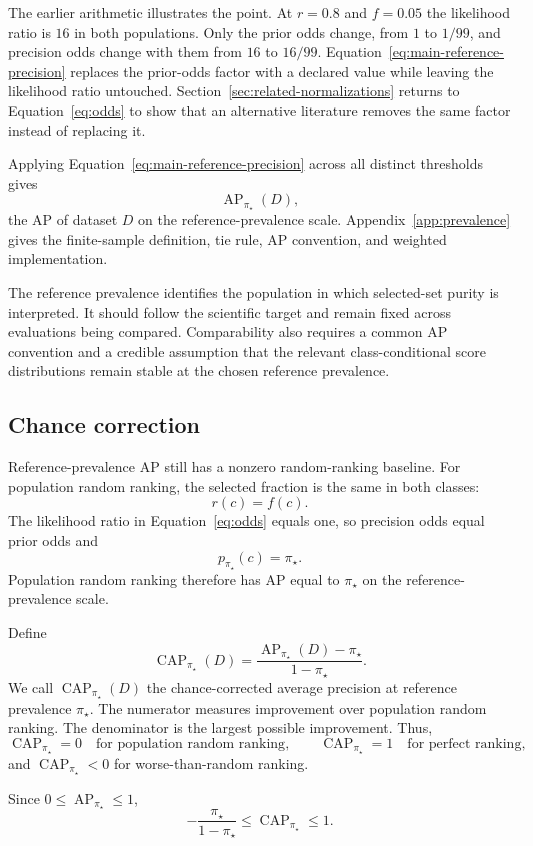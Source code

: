 \documentclass[11pt]{article}
\newcommand{\AP}{\operatorname{AP}}
\newcommand{\CAP}{\operatorname{CAP}}
\newcommand{\Tpi}{\CAP_{\pi_\star}}
\theoremstyle{remark}
\begin{document}
The earlier arithmetic illustrates the point. At $r=0.8$ and $f=0.05$ the likelihood ratio is $16$ in both populations. Only the prior odds change, from $1$ to $1/99$, and precision odds change with them from $16$ to $16/99$. Equation~\eqref{eq:main-reference-precision} replaces the prior-odds factor with a declared value while leaving the likelihood ratio untouched. Section~\ref{sec:related-normalizations} returns to Equation~\eqref{eq:odds} to show that an alternative literature removes the same factor instead of replacing it.

Applying Equation~\eqref{eq:main-reference-precision} across all distinct thresholds gives
\[
\AP_{\pi_\star}(D),
\]
the AP of dataset $D$ on the reference-prevalence scale. Appendix~\ref{app:prevalence} gives the finite-sample definition, tie rule, AP convention, and weighted implementation.

The reference prevalence identifies the population in which selected-set purity is interpreted. It should follow the scientific target and remain fixed across evaluations being compared. Comparability also requires a common AP convention and a credible assumption that the relevant class-conditional score distributions remain stable at the chosen reference prevalence.

\subsection{Chance correction}

Reference-prevalence AP still has a nonzero random-ranking baseline. For population random ranking, the selected fraction is the same in both classes:
\[
r(c)=f(c).
\]
The likelihood ratio in Equation~\eqref{eq:odds} equals one, so precision odds equal prior odds and
\[
p_{\pi_\star}(c)=\pi_\star.
\]
Population random ranking therefore has AP equal to $\pi_\star$ on the reference-prevalence scale.

Define
\begin{equation}
\Tpi(D)
=
\frac{\AP_{\pi_\star}(D)-\pi_\star}{1-\pi_\star}.
\label{eq:T}
\end{equation}
We call $\Tpi(D)$ the chance-corrected average precision at reference prevalence $\pi_\star$. The numerator measures improvement over population random ranking. The denominator is the largest possible improvement. Thus,
\[
\Tpi=0 \quad \text{for population random ranking},
\qquad
\Tpi=1 \quad \text{for perfect ranking},
\]
and $\Tpi<0$ for worse-than-random ranking.

Since $0\leq \AP_{\pi_\star}\leq 1$,
\[
-\frac{\pi_\star}{1-\pi_\star}
\leq \Tpi\leq 1.
\]
\end{document}
